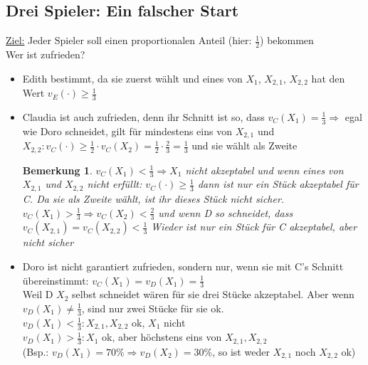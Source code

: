 \documentclass[a4paper,10pt]{scrartcl}
\newtheorem*{bemerkung*}{Bemerkung}
\begin{document}
\subsection{Drei Spieler: Ein falscher Start}
 \underline{Ziel:} Jeder Spieler soll einen proportionalen Anteil (hier: $\frac{1}{2}$) bekommen\\
 Wer ist zufrieden?
 \begin{itemize}
  \item Edith bestimmt, da sie zuerst wählt und eines von $X_1$, $X_{2,1}$, $X_{2,2}$ hat den Wert $v_E(\cdot)\geq\frac{1}{3}$
  \item Claudia ist auch zufrieden, denn ihr Schnitt ist so, dass $v_C(X_1)=\frac{1}{3}\Rightarrow$ egal wie Doro schneidet, 
        gilt für mindestens eins von $X_{2,1}$ und $X_{2,2}: v_C(\cdot)\geq\frac{1}{2}\cdot v_C(X_2)=\frac{1}{2}\cdot\frac{2}{3}=
        \frac{1}{3}$ und sie wählt als Zweite 
        \begin{bemerkung*} 
         $v_C(X_1)<\frac{1}{3}\Rightarrow X_1$ nicht akzeptabel und wenn eines von $X_{2,1}$ und $X_{2,2}$ nicht erfüllt:
         $v_C(\cdot)\geq\frac{1}{3}$ dann ist nur ein Stück akzeptabel für C. Da sie als Zweite wählt, ist ihr dieses Stück nicht sicher.
         $v_C(X_1)>\frac{1}{3}\Rightarrow v_C(X_2)<\frac{2}{3}$ und wenn D so schneidet, dass $v_C(X_{2,1})=v_C(X_{2,2})<\frac{1}{3}$
         Wieder ist nur ein Stück für C akzeptabel, aber nicht sicher
        \end{bemerkung*}
  \item Doro ist nicht garantiert zufrieden, sondern nur, wenn sie mit C's Schnitt über\-einstimmt: $v_C(X_1)=v_D(X_1)=\frac{1}{3}$\\
        Weil D $X_2$ selbst schneidet wären für sie drei Stücke akzeptabel. Aber wenn $v_D(X_1)\neq\frac{1}{3}$, sind nur zwei Stücke
        für sie ok. \\
        $v_D(X_1)<\frac{1}{3}: X_{2,1},X_{2,2}$ ok, $X_1$ nicht\\
        $v_D(X_1)>\frac{1}{3}: X_1$ ok, aber höchstens eins von $X_{2,1},X_{2,2}$\\
        (Bsp.: $v_D(X_1)=70\%\Rightarrow v_D(X_2)=30\%$, so ist weder $X_{2,1}$ noch $X_{2,2}$ ok)
 \end{itemize}
\end{document}

